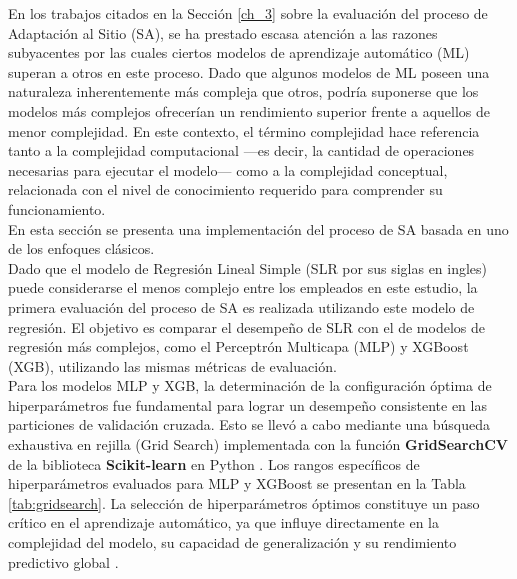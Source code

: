 En los trabajos citados en la Sección \ref{ch_3} sobre la evaluación del proceso de Adaptación al Sitio (SA), se ha prestado escasa atención a las razones subyacentes por las cuales ciertos modelos de aprendizaje automático (ML) superan a otros en este proceso. Dado que algunos modelos de ML poseen una naturaleza inherentemente más compleja que otros, podría suponerse que los modelos más complejos ofrecerían un rendimiento superior frente a aquellos de menor complejidad. En este contexto, el término complejidad hace referencia tanto a la complejidad computacional —es decir, la cantidad de operaciones necesarias para ejecutar el modelo— como a la complejidad conceptual, relacionada con el nivel de conocimiento requerido para comprender su funcionamiento.\\

En esta sección se presenta una implementación del proceso de SA basada en uno de los enfoques clásicos.\\

Dado que el modelo de Regresión Lineal Simple (SLR por sus siglas en ingles) puede considerarse el menos complejo entre los empleados en este estudio, la primera evaluación del proceso de SA es realizada utilizando este modelo de regresión. El objetivo es comparar el desempeño de SLR con el de modelos de regresión más complejos, como el Perceptrón Multicapa (MLP) y XGBoost (XGB), utilizando las mismas métricas de evaluación.\\

Para los modelos MLP y XGB, la determinación de la configuración óptima de hiperparámetros fue fundamental para lograr un desempeño consistente en las particiones de validación cruzada. Esto se llevó a cabo mediante una búsqueda exhaustiva en rejilla (Grid Search) implementada con la función \textbf{GridSearchCV} de la biblioteca \textbf{Scikit-learn} en Python \citep{Pedregosa2012}. Los rangos específicos de hiperparámetros evaluados para MLP y XGBoost se presentan en la Tabla \ref{tab:gridsearch}. La selección de hiperparámetros óptimos constituye un paso crítico en el aprendizaje automático, ya que influye directamente en la complejidad del modelo, su capacidad de generalización y su rendimiento predictivo global \citep{Goodfellow2016}.\\



